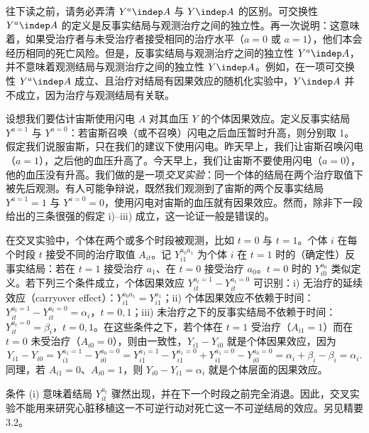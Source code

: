 往下读之前，请务必弄清 $Y^{a}\indep A$ 与 $Y\indep A$ 的区别。可交换性 $Y^{a}\indep A$ 的定义是反事实结局与观测治疗之间的独立性。再一次说明：这意味着，如果受治疗者与未受治疗者接受相同的治疗水平（$a=0$ 或 $a=1$），他们本会经历相同的死亡风险。但是，反事实结局与观测治疗之间的独立性 $Y^{a}\indep A$，并不意味着观测结局与观测治疗之间的独立性 $Y\indep A$。例如，在一项可交换性 $Y^{a}\indep A$ 成立、且治疗对结局有因果效应的随机化实验中，$Y\indep A$ 并不成立，因为治疗与观测结局有关联。


\renewcommand{\FPname}{精要（Fine Point）}
\begin{finepoint}[交叉实验]
设想我们要估计宙斯使用闪电 $A$ 对其血压 $Y$ 的个体因果效应。定义反事实结局 $Y^{a=1}$ 与 $Y^{a=0}$：若宙斯召唤（或不召唤）闪电之后血压暂时升高，则分别取 1。假定我们说服宙斯，只在我们的建议下使用闪电。昨天早上，我们让宙斯召唤闪电（$a=1$），之后他的血压升高了。今天早上，我们让宙斯不要使用闪电（$a=0$），他的血压没有升高。我们做的是一项\emph{交叉实验}：同一个体的结局在两个治疗取值下被先后观测。有人可能争辩说，既然我们观测到了宙斯的两个反事实结局 $Y^{a=1}=1$ 与 $Y^{a=0}=0$，使用闪电对宙斯的血压就有因果效应。然而，除非下一段给出的三条很强的假定 i)–iii) 成立，这一论证一般是错误的。

在交叉实验中，个体在两个或多个时段被观测，比如 $t=0$ 与 $t=1$。个体 $i$ 在每个时段 $t$ 接受不同的治疗取值 $A_{it}$。记 $Y_{i1}^{a_0a_1}$ 为个体 $i$ 在 $t=1$ 时的（确定性）反事实结局：若在 $t=1$ 接受治疗 $a_1$、在 $t=0$ 接受治疗 $a_0$。$t=0$ 时的 $Y_{i0}^{a_0}$ 类似定义。若下列三个条件成立，个体因果效应 $Y_{it}^{a_t=1}-Y_{it}^{a_t=0}$ 可识别：i) 无治疗的延续效应（carryover effect）：$Y_{i1}^{a_0a_1}=Y_{i1}^{a_1}$；ii) 个体因果效应不依赖于时间：$Y_{it}^{a_t=1}-Y_{it}^{a_t=0}=\alpha_i$，$t=0,1$；iii) 未治疗之下的反事实结局不依赖于时间：$Y_{it}^{a_t=0}=\beta_i$，$t=0,1$。在这些条件之下，若个体在 $t=1$ 受治疗（$A_{i1}=1$）而在 $t=0$ 未受治疗（$A_{i0}=0$），则由一致性，$Y_{i1}-Y_{i0}$ 就是个体因果效应，因为
\[
Y_{i1}-Y_{i0}=Y_{i1}^{a_1=1}-Y_{i0}^{a_0=0}
=Y_{i1}^{a_1=1}-Y_{i1}^{a_1=0}+Y_{i1}^{a_1=0}-Y_{i0}^{a_0=0}
=\alpha_i+\beta_i-\beta_i=\alpha_i.
\]
同理，若 $A_{i1}=0$、$A_{i0}=1$，则 $Y_{i0}-Y_{i1}=\alpha_i$ 就是个体层面的因果效应。

条件 (i) 意味着结局 $Y_{it}^{a_t}$ 骤然出现，并在下一个时段之前完全消退。因此，交叉实验不能用来研究心脏移植这一不可逆行动对死亡这一不可逆结局的效应。另见精要 3.2。
\end{finepoint}
\renewcommand{\FPname}{精要}

